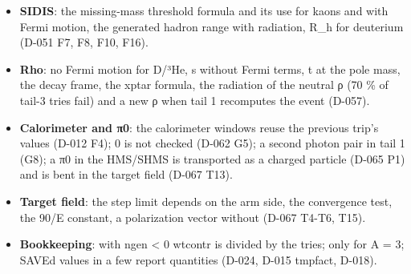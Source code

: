 \begin{itemize}
production; a new Δ mass when tail 1 recomputes the event; single-precision MAID amplitudes (D-038 F3, F4, F9, F12); a
fixed kaon decay model, the Saghai angles, the Saghai table records, the proton mass for Σ− (D-043).
\item \textbf{SIDIS}: the missing-mass threshold formula and its use for kaons and with Fermi motion, the generated hadron range
with radiation, R\_h for deuterium (D-051 F7, F8, F10, F16).
\item \textbf{Rho}: no Fermi motion for D/³He, s without Fermi terms, t at the pole mass, the decay frame, the xptar formula, the
radiation of the neutral ρ (70 \% of tail-3 tries fail) and a new ρ when tail 1 recomputes the event (D-057).
\item \textbf{Calorimeter and π0}: the calorimeter windows reuse the previous trip's values (D-012 F4);  0 is not
checked (D-062 G5); a second photon pair in tail 1 (G8); a π0 in the HMS/SHMS is transported as a charged particle (D-065
P1) and is bent in the target field (D-067 T13).
\item \textbf{Target field}: the step limit depends on the arm side, the convergence test, the 90/E constant, a polarization
vector without  (D-067 T4-T6, T15).
\item \textbf{Bookkeeping}: with ngen < 0 wtcontr is divided by the tries;  only for A = 3; SAVEd values in a few
report quantities (D-024, D-015 tmpfact, D-018).
\end{itemize}
